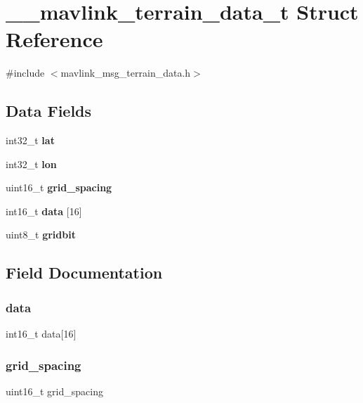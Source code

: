 \section{\+\_\+\+\_\+mavlink\+\_\+terrain\+\_\+data\+\_\+t Struct Reference}
\label{struct____mavlink__terrain__data__t}


{\ttfamily \#include $<$mavlink\+\_\+msg\+\_\+terrain\+\_\+data.\+h$>$}

\subsection*{Data Fields}
\begin{DoxyCompactItemize}
\item 
int32\+\_\+t \textbf{ lat}
\item 
int32\+\_\+t \textbf{ lon}
\item 
uint16\+\_\+t \textbf{ grid\+\_\+spacing}
\item 
int16\+\_\+t \textbf{ data} [16]
\item 
uint8\+\_\+t \textbf{ gridbit}
\end{DoxyCompactItemize}


\subsection{Field Documentation}
\mbox{\label{struct____mavlink__terrain__data__t_a1b43b82229e564b815b7d0c1b8168eda}} 
\subsubsection{data}
{\footnotesize\ttfamily int16\+\_\+t data[16]}

\mbox{\label{struct____mavlink__terrain__data__t_ab838e1bf7a2eea51887457bab8d05555}} 
\subsubsection{grid\+\_\+spacing}
{\footnotesize\ttfamily uint16\+\_\+t grid\+\_\+spacing}

